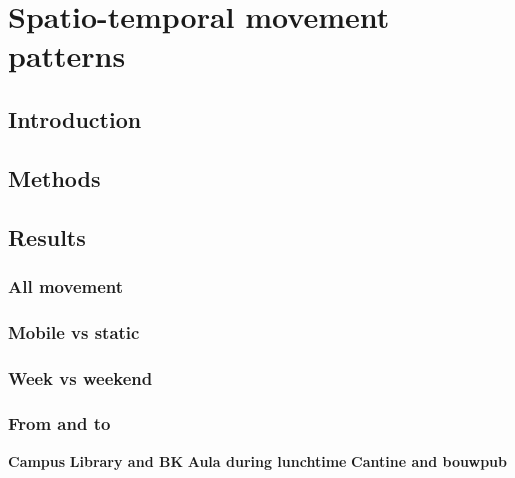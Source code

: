 \chapter{Spatio-temporal movement patterns}\label{hernoemen}
\section{Introduction}

\section{Methods}

\section{Results}\label{results}
\subsection{All movement}
\subsection{Mobile vs static}
\subsection{Week vs weekend}
\subsection{From and to}
\textbf{Campus}
\textbf{Library and BK}
\textbf{Aula during lunchtime}
\textbf{Cantine and bouwpub}